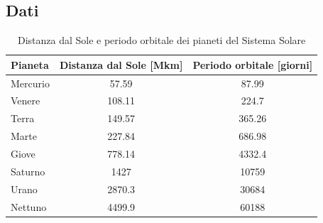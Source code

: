 \documentclass[letterpaper, 12pt]{article}
\begin{document}
\subsection{Dati}
\begin{table}[!ht]
\centering
\caption{Distanza dal Sole e periodo orbitale dei pianeti del Sistema Solare}
\label{tab:pianeti}
\begin{tabular}{|l|c|c|}
\hline
\textbf{Pianeta} & \textbf{Distanza dal Sole [Mkm]} & \textbf{Periodo orbitale [giorni]} \\
\hline
Mercurio & 57.59   & 87.99   \\
Venere   & 108.11  & 224.7   \\
Terra    & 149.57  & 365.26  \\
Marte    & 227.84  & 686.98  \\
Giove    & 778.14  & 4332.4  \\
Saturno  & 1427    & 10759   \\
Urano    & 2870.3  & 30684   \\
Nettuno  & 4499.9  & 60188   \\
\hline
\end{tabular}
\end{table}
\end{document}
